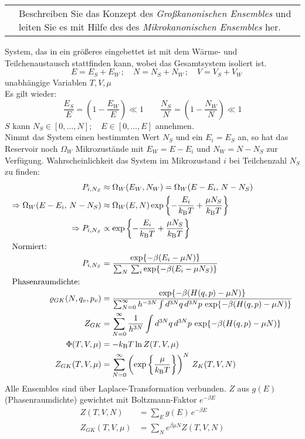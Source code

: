\documentclass[a4paper,12pt]{scrartcl}
\makeatletter
\def\dsum{\sum\limits}					%
\def\kB{k_\mathrm{B}}					%
\newcounter{qc}\setcounter{qc}{1}
\newenvironment{fshaded}{
\def\FrameCommand{\fcolorbox{framecolor}{shadecolor}}
\MakeFramed {\FrameRestore}}
{\endMakeFramed}
\def\frage#1{
\begin{fshaded}
\noindent
\begin{tabularx}{0.99\textwidth}{@{}c!{\color{framecolor}\vline}X}
{ \bf \rm \theqc }	&	\noindent #1
\end{tabularx}
\stepcounter{qc}
\end{fshaded}
}
\makeatother
\begin{document}
\frage{Beschreiben Sie das Konzept des \textit{Großkanonischen Ensembles} und leiten Sie es mit Hilfe des des 
\textit{Mikrokanonischen Ensembles} her.}
\noindent
System, das in ein größeres eingebettet ist mit dem Wärme- und Teilchenaustausch stattfinden kann, wobei das Gesamtsystem 
isoliert ist.
\[ \quad E=E_S+E_W\,; \quad N=N_S+N_W\,; \quad V=V_S+V_W \]
unabhängige Variablen $T,V,\mu$\\

\noindent Es gilt wieder:
\[ \dfrac{E_S}{E}=\left(1-\dfrac{E_W}{E} \right) \ll 1 \qquad \dfrac{N_S}{N}=\left(1-\dfrac{N_W}{N} \right) \ll 1 \]
$S$ kann $N_S \in [0,\ldots,N];\quad E \in [0,\ldots,E]$ annehmen.\\

\noindent Nimmt das System einen bestimmten Wert $N_S$ und ein $E_i=E_S$ an, so hat das Reservoir noch $\Omega_W$ 
Mikrozustände mit $E_W=E-E_i$ und $N_W=N-N_S$ zur Verfügung. Wahrscheinlichkeit das System im Mikrozustand $i$ bei 
Teilchenzahl $N_S$ zu finden:
\begin{align*}
P_{i,N_S} &\approx \Omega_W(E_W,N_W)=\Omega_W(E-E_i,\,N-N_S)\\
\Rightarrow \Omega_W(E-E_i,\,N-N_S) &\approx \Omega_W(E,N) \exp \left\{ -\dfrac{E_i}{\kB  T} + \dfrac{\mu N_S}{\kB  T} \right\} 
\\
\Rightarrow P_{i,N_S} &\propto \exp \left\{ -\dfrac{E_i}{\kB  T} + \dfrac{\mu N_S}{\kB  T} \right\}\\
\intertext{Normiert:}
P_{i,N_S} &=\dfrac{\exp \{ -\beta(E_i-\mu N) \} }{\sum_N\,\sum_i \exp \{ -\beta(E_i-\mu N_S) \}}\\
\intertext{Phasenraumdichte:}
\varrho_{GK}(N,q_v,p_v)&=\dfrac{ \exp \{ -\beta(H(q,p)-\mu N) \} }{\sum_{N=0}^{\infty} {h^{-3N}}\int d^{3N}q\,d^{3N}p\,\exp \{ -\beta(H(q,p)-\mu N) \} }\\
Z_{GK}&=\dsum_{N=0}^{\infty} \frac{1}{h^{3N}}\int d^{3N}q\,d^{3N}p\,\exp \{ -\beta(H(q,p)-\mu N) \}\\
\Phi(T,V,\mu)&=-\kB  T \ln Z(T,V,\mu)\\
Z_{GK}(T,V,\mu)&=\sum_{N=0}^{\infty}\left( \exp \left\{ \dfrac{\mu}{\kB  T} \right\} \right)^N\,Z_K(T,V,N)\\
\end{align*}
Alle Ensembles sind über Laplace-Transformation verbunden. $Z$ aus $g(E)$ (Phasenraumdichte) gewichtet mit Boltzmann-Faktor 
$e^{-\beta E}$
\begin{align*}
Z(T,V,N)&=\sum_E g(E)\,e^{-\beta E}\\
Z_{GK}(T,V,\mu)&=\sum_N e^{\beta \mu N}Z(T,V,N)
\end{align*}
\end{document}
